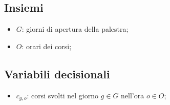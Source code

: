\subsection{Insiemi}
\begin{itemize}
	\item $G$: giorni di apertura della palestra;
	\item $O$: orari dei corsi;
\end{itemize}

\subsection{Variabili decisionali}
\begin{itemize}
	\item $c_{g,o}$: corsi svolti nel giorno $g \in G$ nell'ora $o \in O$;
\end{itemize}
